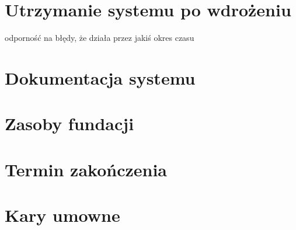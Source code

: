\documentclass{article}
\begin{document}
\section{Utrzymanie systemu po wdrożeniu}
odporność na błędy, że działa przez jakiś okres czasu

\section{Dokumentacja systemu}
\section{Zasoby fundacji}

\section{Termin zakończenia}

\section{Kary umowne}
\end{document}
